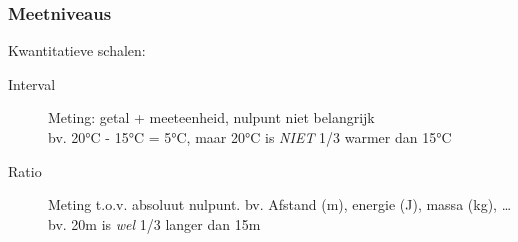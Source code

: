 \documentclass{beamer}
\begin{document}
\begin{frame}
  \frametitle{Meetniveaus}

  Kwantitatieve schalen:

  \begin{description}
    \item[Interval] Meting: getal + meeteenheid, nulpunt niet belangrijk\\
      bv. 20°C - 15°C = 5°C, maar 20°C is \emph{NIET} 1/3 warmer dan 15°C
    \item[Ratio] Meting t.o.v. absoluut nulpunt. bv. Afstand (m), energie (J), massa (kg), \ldots\\
      bv. 20m is \emph{wel} 1/3 langer dan 15m
  \end{description}
\end{frame}
\end{document}
